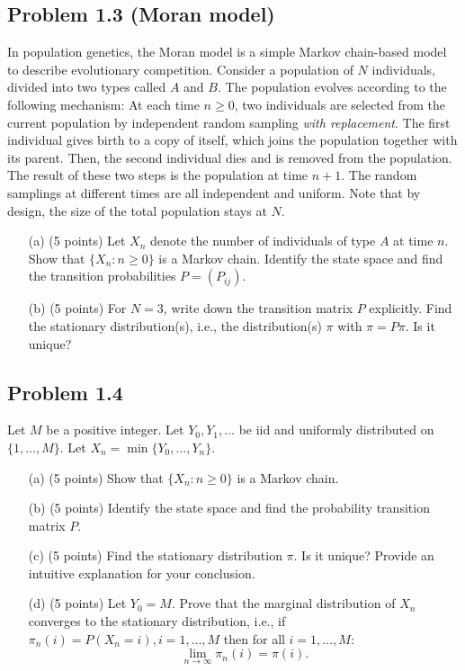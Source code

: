 \documentclass{article}
\begin{document}
\subsection*{Problem 1.3 (Moran model)} 
In population genetics, the
Moran model is a simple Markov chain-based model to describe
evolutionary competition. Consider a population of $N$ individuals,
divided into two types called $A$ and $B$. The population evolves
according to the following mechanism: At each time $n \geq 0$, two
individuals are selected from the current population by independent
random sampling \textit{with replacement}. The first individual gives
birth to a copy of itself, which joins the population together with
its parent. Then, the second individual dies and is removed from the
population. The result of these two steps is the population at time
$n + 1$. The random samplings at different times are all independent
and uniform. Note that by design, the size of the total population
stays at $N$.

\begin{enumerate}
    \item[(a)] (5 points) Let $X_n$ denote the number of individuals of type $A$ at time $n$. Show that $\{X_n : n \geq 0\}$ is a Markov chain. Identify the state space and find the transition probabilities $P = (P_{ij})$.
    \item[(b)] (5 points) For $N = 3$, write down the transition matrix $P$ explicitly. Find the stationary distribution(s), i.e., the distribution(s) $\pi$ with $\pi = P \pi$. Is it unique?
\end{enumerate}

\subsection*{Problem 1.4}
Let $M$ be a positive integer. Let $Y_0, Y_1, \ldots$ be iid and uniformly distributed on $\{1, \ldots, M\}$. Let $X_n = \min\{Y_0, \ldots, Y_n\}$.

\begin{enumerate}
    \item[(a)] (5 points) Show that $\{X_n : n \geq 0\}$ is a Markov chain.
    \item[(b)] (5 points) Identify the state space and find the probability transition matrix $P$.
    \item[(c)] (5 points) Find the stationary distribution $\pi$. Is it unique? Provide an intuitive explanation for your conclusion.
    \item[(d)] (5 points) Let $Y_0 = M$. Prove that the marginal distribution of $X_n$ converges to the stationary distribution, i.e., if $\pi_n(i) = P(X_n = i), i = 1, \ldots, M$ then for all $i = 1, \ldots, M$:
    \[
    \lim_{n \to \infty} \pi_n(i) = \pi(i).
    \]
\end{enumerate}
\end{document}
